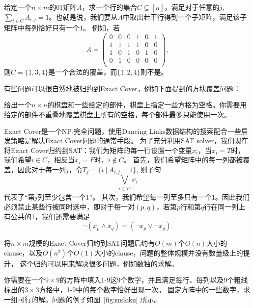 \begin{prob}
 给定一个$n\times m$的01矩阵$A$，求一个行的集合$C\subseteq[n]$，满足对于任意的$j$, 
 $\sum_{i\in C} A_{i,j} = 1$。也就是说，我们要从$A$中取出若干行得到一个子矩阵，满足该子矩阵中每列恰好只有一个$1$。
 例如，若
 $$A = 
 \begin{pmatrix}
  0 & 0 & 0 & 1 & 0 & 1\\
  1 & 1 & 1 & 1 & 0 & 0\\
  1 & 0 & 1 & 0 & 1 & 0\\
  0 & 1 & 0 & 0 & 0 & 0\\
 \end{pmatrix},
 $$
 则$C=\{1, 3, 4\}$是一个合法的覆盖，而$\{1, 2, 4\}$则不是。
\end{prob}

有些问题可以很自然地被归约到Exact Cover，例如下面提到的方块覆盖问题：

\begin{prob}
给出一个$n\times n$的棋盘和一些给定的部件，棋盘上指定一些方格为空格。你需要用给定的部件不重叠地覆盖棋盘上所有的空格，每个部件最多只能使用一次。
\end{prob}



\begin{solution}
Exact Cover是一个NP-完全问题，使用Dancing Links数据结构的搜索配合一些启发策略是解决Exact Cover问题的通常手段。
为了充分利用SAT solver，我们现在将Exact Cover归约到SAT：我们为矩阵的每一行设置一个变量$x_i$，当$x_i=T$时，我们希望$i\in C$，相反当$x_i=F$时，$i\notin C$。
首先，我们希望矩阵中的每一列都被覆盖，因此对于每一列$j$，令$T_j = \{ i~|~ A_{i,j} = 1\}$, 则子句
$$\bigvee_{i \in T_j} x_i$$
代表了``第$j$列至少包含一个1''。
其次，我们希望每一列至多只有一个1。因此我们必须禁止某些行被同时选中，即对于每一对$(p,q)$，若第$p$行和第$q$行在同一列上有公共的1，我们还需要满足
$$\neg (x_p \land x_q) = (\neg x_p \lor \neg x_q).$$
\end{solution}

将$n\times m$规模的Exact Cover归约到SAT问题后约有$O(m)$个$O(n)$大小的clause，以及$O(n^2)$个$O(1)$大小的clause，问题的整体规模并没有数量级上的提升，
这个归约可以用来解决很多问题，例如数独的求解。

\begin{prob}
 你需要在一个$9\times9$的方阵中填入1-9这9个数字，并且满足每行、每列以及9个粗线标出的$3\times3$方格中，1-9中的每个数字恰好出现一次。
 固定方阵中的一些数字，求一组可行的解。问题的例子如图~\ref{fig:sudoku} 所示。
\end{prob}

